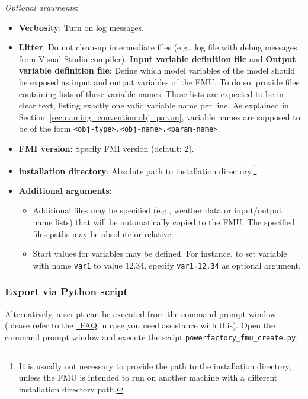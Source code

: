 \textit{Optional arguments}:
\begin{itemize}
   \item \textbf{Verbosity}: Turn on log messages.
   \item \textbf{Litter}: Do not clean-up intermediate files (e.g., log file with debug messages from Visual Studio compiler).
   \ietm \textbf{Input variable definition file} and \textbf{Output variable definition file}:
   Define which model variables of the \pf model should be exposed as input and output variables of the FMU.
   To do so, provide files containing lists of these variable names.
   These lists are expected to be in clear text, listing exactly one valid variable name per line.
   As explained in Section~\ref{sec:naming_convention:obj_param}, variable names are supposed to be of the  form \texttt{<obj-type>.<obj-name>.<param-name>}.
   \item \textbf{FMI version}: Specify FMI version (default: 2).
   \item \textbf{\pf installation directory}: Absolute path to \pf installation directory.\footnote{It is usually not necessary to provide the path to the \pf installation directory, unless the FMU is intended to run on another machine with a different installation directory path.}
   \item \textbf{Additional arguments}:
   \begin{itemize}
      \item Additional files may be specified (e.g., weather data or input/output name lists) that will be automatically copied to the FMU. The specified files paths may be absolute or relative.
      \item Start values for variables may be defined. For instance, to set variable with name \verb!var1! to value 12.34, specify \verb!var1=12.34! as optional argument.
   \end{itemize}
\end{itemize}

\clearpage

\subsubsection*{Export via Python script}

Alternatively, a \python script can be executed from the command prompt window (please refer to the \href{https://docs.python.org/3/faq/windows.html}{\python~FAQ} in case you need assistance with this).
Open the command prompt window and execute the script \texttt{powerfactory\_fmu\_create.py}:


